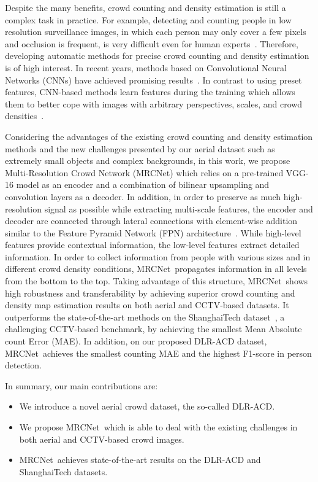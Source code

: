 \documentclass{bmvc2k}
\newcommand{\squeezeup}{\vspace{-2mm}}
\newcommand{\XNET}{MRCNet}
\begin{document}
Despite the many benefits, crowd counting and density estimation is still a complex task in practice. For example, detecting and counting people in low resolution surveillance images, in which each person may only cover a few pixels and occlusion is frequent, is very difficult even for human experts~\cite{Kang2019,Liu2018}.
Therefore, developing automatic methods for precise crowd counting and density estimation is of high interest. 
In recent years, methods based on Convolutional Neural Networks (CNNs) have achieved promising results~\cite{Boominathan2016,Zhang2016,Sam2017,Sam2018,Sindagi2018,Zeng2017,Cao2018,Wang2018,Idrees2018,Huang2017,Liu2018b,Shi2018,Ranjan2018}. 
In contrast to using preset features, CNN-based methods learn features during the training which allows them to better cope with images with arbitrary perspectives, scales, and crowd densities~\cite{Sindagi2017}.

Considering the advantages of the existing crowd counting and density estimation methods and the new challenges presented by our aerial dataset such as extremely small objects and complex backgrounds, in this work, we propose Multi-Resolution Crowd Network (\XNET) which relies on a pre-trained VGG-16 model as an encoder and a combination of bilinear upsampling and convolution layers as a decoder. In addition, in order to
preserve as much high-resolution signal as possible while extracting multi-scale features,
the encoder and decoder are connected through lateral connections with element-wise addition similar to the Feature Pyramid Network (FPN) architecture~\cite{Lin2017}. 
While high-level features provide contextual information, the low-level features extract detailed information. In order to collect information from people with various sizes and in different crowd density conditions, \XNET~propagates information in all levels from the bottom to the top.
Taking advantage of this structure, \XNET~shows high robustness and transferability by achieving superior crowd counting and density map estimation results on both aerial and CCTV-based datasets. It outperforms the state-of-the-art methods on the ShanghaiTech dataset~\cite{Zhang2016}, a challenging CCTV-based benchmark, by achieving the smallest Mean Absolute count Error (MAE). In addition, on our proposed DLR-ACD dataset, \XNET~achieves the smallest counting MAE and the highest F1-score in person detection.

In summary, our main contributions are:
\squeezeup
\begin{itemize}
    \item We introduce a novel aerial crowd dataset, the so-called DLR-ACD.
    \squeezeup
    \item We propose \XNET~which is able to deal with the existing challenges in both aerial and CCTV-based crowd images.
    \squeezeup
    \item \XNET~achieves state-of-the-art results on the DLR-ACD and ShanghaiTech datasets.
\end{itemize}
\end{document}
